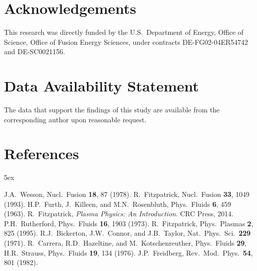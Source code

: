 \documentclass[12pt,prb,aps]{revtex4-1}
\begin{document}
\section*{Acknowledgements}
This research was directly funded by the U.S.\ Department of Energy, Office of Science, Office of Fusion Energy Sciences,  under  contracts DE-FG02-04ER54742 and DE-SC0021156. 

\section*{Data Availability Statement}
The data that support the findings of this study are available from the corresponding author upon reasonable request.

\section*{References}
\begin{thebibliography}{99}\baselineskip 5ex

 J.A.~Wesson, Nucl.\ Fusion {\bf 18}, 87 (1978).
 R.~Fitzpatrick, Nucl.\ Fusion {\bf 33}, 1049 (1993). 
 H.P.~Furth, J.~Killeen, and M.N.~Rosenbluth, Phys.\ Fluids {\bf 6}, 459 (1963).
 R.~Fitzpatrick, {\em Plasma Physics: An Introduction}. CRC Press, 2014. 
 P.H.~Rutherford,  Phys.\ Fluids {\bf 16}, 1903 (1973).
 R.~Fitzpatrick, Phys.\ Plasmas {\bf 2}, 825 (1995).
 R.J.~Bickerton, J.W.~Connor, and J.B.~Taylor, Nat.\ Phys.\ Sci.\ {\bf 229} (1971).
 R.~Carrera, R.D.~Hazeltine, and M.~Kotschenreuther, Phys.\ Fluids {\bf 29},
 H.R.~Strauss, Phys.\  Fluids {\bf 19}, 134 (1976). 
 J.P.~Freidberg, Rev.\ Mod.\ Phys.\ {\bf 54}, 801 (1982). 

\end{thebibliography}

\end{document}
